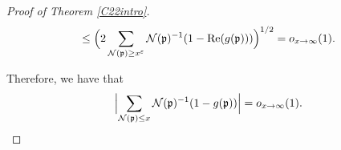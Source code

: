 \documentclass[11pt]{amsart}
\theoremstyle{definition}
\newcommand{\NN}{{\mathcal N}}
\newcommand{\mf}{\mathfrak}
\begin{document}
\begin{proof}[Proof of Theorem \ref{C22intro}]
\begin{equation}
\begin{split}
      \leq \Bigl(2\sum_{\NN(\mf p)\geq x^{\varepsilon}}\NN(\mf p)^{-1}(1-\text{Re}(g(\mf p)))\Bigr)^{1/2}=o_{x\to\infty}(1).
   \end{split}
   \end{equation}

   Therefore, we have that
  \begin{equation}\label{cd1}
   \begin{split}
    \Bigl\vert\sum_{\NN(\mf p)\leq x}\NN(\mf p)^{-1}(1-g(\mf p))\Bigr\vert=o_{x\to\infty}(1).
   \end{split}
   \end{equation}
   

\end{proof}
\end{document}
